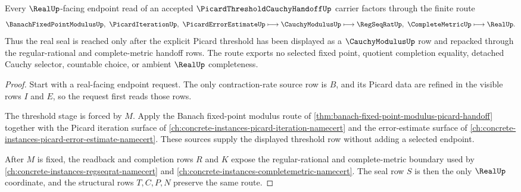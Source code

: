 \begin{theorem}
\label{thm:picard-threshold-cauchy-handoff-real-seal}
Every $\RealUp$-facing endpoint read of an accepted $\PicardThresholdCauchyHandoffUp$ carrier factors through the finite route
$$
\BanachFixedPointModulusUp,\ \PicardIterationUp,\ \PicardErrorEstimateUp
\longmapsto
\CauchyModulusUp
\longmapsto
\RegSeqRatUp,\ \CompleteMetricUp
\longmapsto
\RealUp .
$$
Thus the real seal is reached only after the explicit Picard threshold has been displayed as a $\CauchyModulusUp$ row and repacked through the regular-rational and complete-metric handoff rows. The route exports no selected fixed point, quotient completion equality, detached Cauchy selector, countable choice, or ambient $\RealUp$ completeness.
\end{theorem}
\begin{proof}
Start with a real-facing endpoint request. The only contraction-rate source row is $B$, and its Picard data are refined in the visible rows $I$ and $E$, so the request first reads those rows.

The threshold stage is forced by $M$. Apply the Banach fixed-point modulus route of \autoref{thm:banach-fixed-point-modulus-picard-handoff} together with the Picard iteration surface of \autoref{ch:concrete-instances-picard-iteration-namecert} and the error-estimate surface of \autoref{ch:concrete-instances-picard-error-estimate-namecert}. These sources supply the displayed threshold row without adding a selected endpoint.

After $M$ is fixed, the readback and completion rows $R$ and $K$ expose the regular-rational and complete-metric boundary used by \autoref{ch:concrete-instances-regseqrat-namecert} and \autoref{ch:concrete-instances-completemetric-namecert}. The seal row $S$ is then the only $\RealUp$ coordinate, and the structural rows $T,C,P,N$ preserve the same route.
\end{proof}


